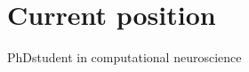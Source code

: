 \documentclass[a4]{article}
\author{Tomas Fiers}
\begin{document}
{\huge \@author}

\section*{Current position}

PhDstudent in computational neuroscience
\end{document}
